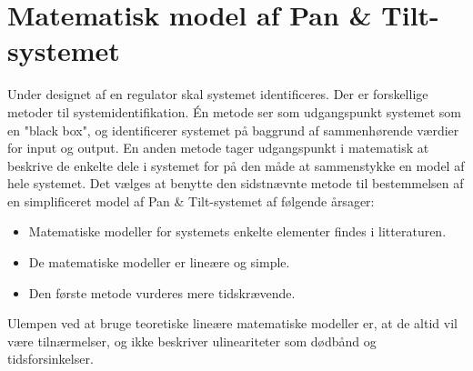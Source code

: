 \section{Matematisk model af Pan \& Tilt-systemet}
Under designet af en regulator skal systemet identificeres. Der er forskellige metoder til systemidentifikation.
Én metode ser som udgangspunkt systemet som en "black box", og identificerer systemet
på baggrund af sammenhørende værdier for input og output.
En anden metode tager udgangspunkt i matematisk at beskrive de enkelte dele i systemet
for på den måde at sammenstykke en model af hele systemet.
Det vælges at benytte den sidstnævnte metode til bestemmelsen af en simplificeret
model af Pan \& Tilt-systemet af følgende årsager:
\begin{itemize}
\item Matematiske modeller for systemets enkelte elementer findes i litteraturen.
\item De matematiske modeller er lineære og simple.
\item Den første metode vurderes mere tidskrævende.
\end{itemize}
Ulempen ved at bruge teoretiske lineære matematiske modeller er,
at de altid vil være tilnærmelser, og ikke beskriver ulineariteter som dødbånd og tidsforsinkelser.

